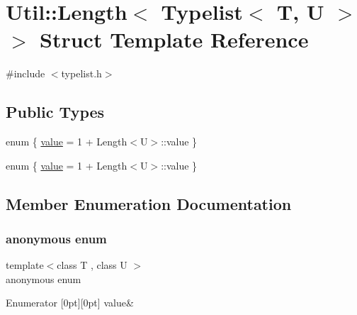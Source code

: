 \hypertarget{structUtil_1_1TL_1_1Length_3_01Typelist_3_01T_00_01U_01_4_01_4}{}\section{Util\+:\+:Length$<$ Typelist$<$ T, U $>$ $>$ Struct Template Reference}
\label{structUtil_1_1TL_1_1Length_3_01Typelist_3_01T_00_01U_01_4_01_4}


{\ttfamily \#include $<$typelist.\+h$>$}

\subsection*{Public Types}
\begin{DoxyCompactItemize}
\item 
enum \{ \mbox{\hyperlink{structUtil_1_1TL_1_1Length_3_01Typelist_3_01T_00_01U_01_4_01_4_ac90c2b2a9b0c8feb3ecdd90c7754325eae1c428995e62753898edb88edcd08ba4}{value}} = 1 + Length$<$U$>$\+:\+:value
 \}
\item 
enum \{ \mbox{\hyperlink{structUtil_1_1TL_1_1Length_3_01Typelist_3_01T_00_01U_01_4_01_4_ac90c2b2a9b0c8feb3ecdd90c7754325eae1c428995e62753898edb88edcd08ba4}{value}} = 1 + Length$<$U$>$\+:\+:value
 \}
\end{DoxyCompactItemize}


\subsection{Member Enumeration Documentation}
\mbox{\label{structUtil_1_1TL_1_1Length_3_01Typelist_3_01T_00_01U_01_4_01_4_a8b8dd6bca8eafe2b08865808c866b463}} 
\subsubsection{\texorpdfstring{anonymous enum}{anonymous enum}}
{\footnotesize\ttfamily template$<$class T , class U $>$ \\
anonymous enum}

\begin{DoxyEnumFields}{Enumerator}
[0pt][0pt]{}\mbox{\label{structUtil_1_1TL_1_1Length_3_01Typelist_3_01T_00_01U_01_4_01_4_ac90c2b2a9b0c8feb3ecdd90c7754325eae1c428995e62753898edb88edcd08ba4}} 
value&\\
\hline

\end{DoxyEnumFields}
\mbox{\label{structUtil_1_1TL_1_1Length_3_01Typelist_3_01T_00_01U_01_4_01_4_ac90c2b2a9b0c8feb3ecdd90c7754325e}} 
